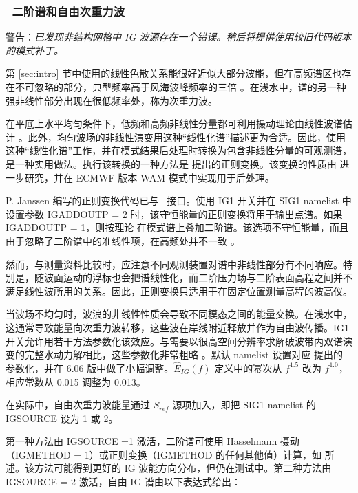 \vsssub
\subsubsection{~二阶谱和自由次重力波} \label{sec:IG1}
\vsssub


\noindent 
警告：{\it 已发现非结构网格中 IG 波源存在一个错误。稍后将提供使用较旧代码版本的模式补丁。}

第 \ref{sec:intro} 节中使用的线性色散关系能很好近似大部分波能，但在高频谱区也存在不可忽略的部分，典型频率高于风海波峰频率的三倍 \citep[e.g.][]{rep:Lec13}。在浅水中，谱的另一种强非线性部分出现在很低频率处，称为次重力波。

在平底上水平均匀条件下，低频和高频非线性分量都可利用摄动理论由线性波谱估计 \citep[e.g.][]{art:Has62}。此外，均匀波场的非线性演变用这种“线性化谱”描述更为合适。因此，使用这种“线性化谱”工作，并在模式结果后处理时转换为包含非线性分量的可观测谱，是一种实用做法。执行该转换的一种方法是 \cite{art:Kra94} 提出的正则变换。该变换的性质由 \cite{art:Jan09} 进一步研究，并在 ECMWF 版本 WAM 模式中实现用于后处理。

P. Janssen 编写的正则变换代码已与 \ws\ 接口。使用 {\code IG1} 开关并在 {\F SIG1} namelist 中设置参数 {\code IGADDOUTP = 2} 时，该守恒能量的正则变换将用于输出点谱。如果 {\code IGADDOUTP = 1}，则按理论 \citep[e.g.][]{art:Has62} 在模式谱上叠加二阶谱。该选项不守恒能量，而且由于忽略了二阶谱中的准线性项，在高频处并不一致 \citep{art:Jan09}。

然而，与测量资料比较时，应注意不同观测装置对谱中非线性部分有不同响应。特别是，随波面运动的浮标也会把谱线性化，而二阶压力场与二阶表面高程之间并不满足线性波所用的关系。因此，正则变换只适用于在固定位置测量高程的波高仪。

当波场不均匀时，波浪的非线性性质会导致不同模态之间的能量交换。在浅水中，这通常导致能量向次重力波转移，这些波在岸线附近释放并作为自由波传播。{\code IG1} 开关允许用若干方法参数化该效应。与需要以很高空间分辨率求解破波带内双谱演变的完整水动力解相比，这些参数化非常粗略 \citep[e.g.][]{art:HB97}。默认 namelist 设置对应 \cite{art:Aea14} 提出的参数化，并在 6.06 版中做了小幅调整。$\widehat{E}_{IG}(f)$ 定义中的幂次从 $f^{1.5}$ 改为 $f^{1.0}$，相应常数从 0.015 调整为 0.013。

在实际中，自由次重力波能量通过 $S_{ref}$ 源项加入，即把 {\code SIG1} namelist 的 {\code IGSOURCE} 设为 1 或 2。

第一种方法由 {\code IGSOURCE =1} 激活，二阶谱可使用 Hasselmann 摄动（{\code IGMETHOD = 1}）或正则变换（{\code IGMETHOD} 的任何其他值）计算，如 \cite{art:Jan09} 所述。该方法可能得到更好的 IG 波能方向分布，但仍在测试中。第二种方法由 {\code IGSOURCE = 2} 激活，自由 IG 谱由以下表达式给出：

